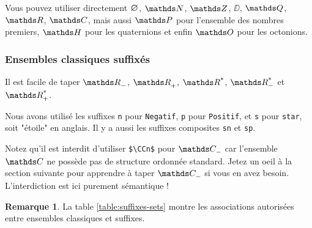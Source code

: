 \documentclass[12pt,a4paper]{article}
\theoremstyle{definition}
\newtheorem*{remark}{Remarque}
\begin{document}
\begin{tcblisting}{}
Vous pouvez utiliser directement $\nullset$, $\NN$, $\ZZ$, $\DD$, $\QQ$, $\RR$, $\CC$,
mais aussi $\PP$ pour l'ensemble des nombres premiers, $\HH$ pour les quaternions et
enfin $\OO$ pour les octonions.
\end{tcblisting}



        \subsubsection{Ensembles classiques suffixés}

\begin{tcblisting}{}
Il est facile de taper $\RRn$, $\RRp$, $\RRs$, $\RRsn$ et $\RRsp$.
\end{tcblisting}


Nous avons utilisé les suffixes \verb+n+ pour \verb+Negatif+, \verb+p+ pour \verb+Positif+, et \verb+s+ pour \verb+star+, soit "étoile" en anglais. Il y a aussi les suffixes composites \verb+sn+ et \verb+sp+.

\medskip

Notez qu'il est interdit d'utiliser \verb+$\CCn$+ pour $\specialset{\CC}{n}$ car l'ensemble $\CC$ ne possède pas de structure ordonnée standard. Jetez un oeil à la section suivante pour apprendre à taper $\specialset{\CC}{n}$ si vous en avez besoin. L'interdiction est ici purement sémantique !

\medskip

\begin{remark}
	La table \ref{table:suffixes-sets}  montre les associations autorisées entre ensembles classiques et suffixes.
\end{remark}

\end{document}
